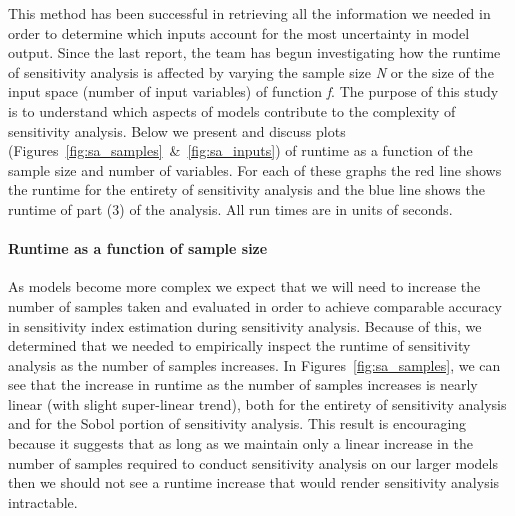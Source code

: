 \documentclass[article, 12pt, oneside]{memoir}
\begin{document}
\noindent This method has been successful in retrieving all the information we
needed in order to determine which inputs account for the most
uncertainty in model output. Since the last report, the team has begun
investigating how the runtime of sensitivity analysis is affected by
varying the sample size \emph{N} or the size of the input space (number
of input variables) of function \emph{f}. The purpose of this study is
to understand which aspects of models contribute to the complexity of
sensitivity analysis. Below we present and discuss plots (Figures~\ref{fig:sa_samples}~\&~\ref{fig:sa_inputs}) of runtime as a
function of the sample size and number of variables. For each of these
graphs the red line shows the runtime for the entirety of sensitivity
analysis and the blue line shows the runtime of part (3) of the
analysis. All run times are in units of seconds.

\hypertarget{runtime-as-a-function-of-sample-size}{%
\paragraph{Runtime as a function of sample
size}\label{runtime-as-a-function-of-sample-size}}

As models become more complex we expect that we will need to increase
the number of samples taken and evaluated in order to achieve comparable
accuracy in sensitivity index estimation during sensitivity analysis.
Because of this, we determined that we needed to empirically inspect the
runtime of sensitivity analysis as the number of samples increases. 
In Figures~\ref{fig:sa_samples}, we can see that the increase in runtime as the number
of samples increases is nearly linear (with slight super-linear trend),
both for the entirety of sensitivity analysis and for the Sobol portion
of sensitivity analysis. This result is encouraging because it suggests
that as long as we maintain only a linear increase in the number of
samples required to conduct sensitivity analysis on our larger models
then we should not see a runtime increase that would render sensitivity
analysis intractable.

\end{document}
